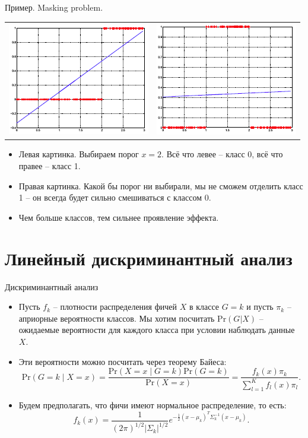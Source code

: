 \documentclass[9pt]{beamer}
\begin{document}
\begin{frame}{Пример. Masking problem.}
\begin{tabular}{cc}
     \includegraphics[height=0.45\textheight]{img/lin_reg_classification_masking_1.png}&
     \includegraphics[height=0.45\textheight]{img/lin_reg_classification_masking_2.png}  \\
\end{tabular}
\begin{itemize}
    \item Левая картинка. Выбираем порог $x = 2$. Всё что левее -- класс 0, всё что правее -- класс 1.
    \item Правая картинка. Какой бы порог ни выбирали, мы не сможем отделить класс 1 -- он всегда будет сильно смешиваться с классом 0.
    \item Чем больше классов, тем сильнее проявление эффекта.
\end{itemize}
\end{frame}

\section{Линейный дискриминантный анализ}

\begin{frame}{Дискриминантный анализ}
\begin{itemize}
    \item Пусть $f_k$ -- плотности распределения фичей $X$ в классе $G = k$ и пусть $\pi_k$ -- априорные вероятности классов. Мы хотим посчитать $\text{Pr}(G|X)$ -- ожидаемые вероятности для каждого класса при условии наблюдать данные $X$.
    \item Эти вероятности можно посчитать через теорему Байеса:
    $$\text{Pr}(G=k \;|\; X = x) = \frac{\text{Pr}(X = x \;|\; G=k)\text{Pr}(G=k)}{\text{Pr}(X=x)} = \frac{f_k(x)\pi_k}{\sum_{l=1}^K f_l(x)\pi_l}.$$
    \item Будем предполагать, что фичи имеют нормальное распределение, то есть:
    $$f_k(x) = \frac{1}{(2\pi)^{1/2}|\Sigma_k|^{1/2}} e^{-\frac{1}{2}(x-\mu_k)^T\Sigma_k^{-1}(x-\mu_k)}.$$
\end{itemize}
\end{frame}
\end{document}
